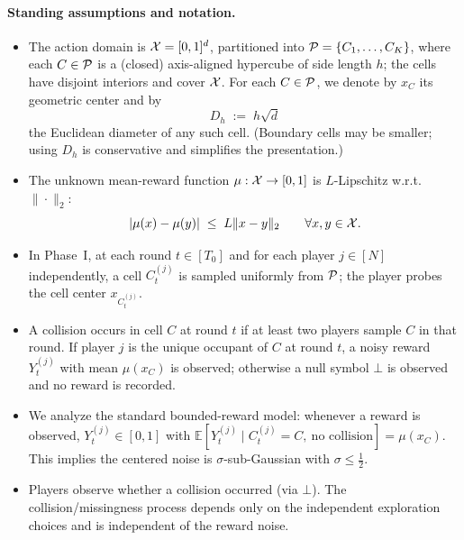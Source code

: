 \paragraph{Standing assumptions and notation.}
\begin{itemize}
    \item The action domain is $\mathcal{X}=[0,1]^d$, partitioned into $\mathcal{P}=\{C_1,\ldots,C_K\}$, where each $C\in\mathcal{P}$ is a (closed) axis-aligned hypercube of side length $h$; the cells have disjoint interiors and cover $\mathcal{X}$. For each $C\in\mathcal{P}$, we denote by $x_C$ its geometric center and by
    \[
        D_h \;:=\; h\sqrt{d}
    \]
    the Euclidean diameter of any such cell. (Boundary cells may be smaller; using $D_h$ is conservative and simplifies the presentation.)
    \item The unknown mean-reward function $\mu:\mathcal{X}\to[0,1]$ is $L$-Lipschitz w.r.t.\ $\|\cdot\|_2$:
    \[
        |\mu(x)-\mu(y)| \;\le\; L\|x-y\|_2\qquad\forall x,y\in\mathcal{X}.
    \]
    \item In Phase~I, at each round $t\in[T_0]$ and for each player $j\in[N]$ independently, a cell $C_t^{(j)}$ is sampled uniformly from $\mathcal{P}$; the player probes the cell center $x_{C_t^{(j)}}$.
    \item A collision occurs in cell $C$ at round $t$ if at least two players sample $C$ in that round. If player $j$ is the unique occupant of $C$ at round $t$, a noisy reward $Y_t^{(j)}$ with mean $\mu(x_C)$ is observed; otherwise a null symbol $\bot$ is observed and no reward is recorded.
    \item We analyze the standard bounded-reward model: whenever a reward is observed, $Y_t^{(j)}\in[0,1]$ with $\mathbb E[Y_t^{(j)}\mid C_t^{(j)}=C,\ \text{no collision}]=\mu(x_C)$. This implies the centered noise is $\sigma$-sub-Gaussian with $\sigma\le\tfrac12$.
    \item Players observe whether a collision occurred (via $\bot$). The collision/missingness process depends only on the independent exploration choices and is independent of the reward noise.
\end{itemize}

